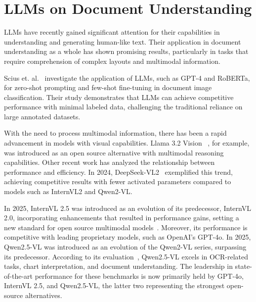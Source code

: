 \section{LLMs on Document Understanding}

\glspl{LLM} have recently gained significant attention for their capabilities in understanding and generating human-like text. Their application in document understanding as a whole has shown promising results, particularly in tasks that require comprehension of complex layouts and multimodal information.

Scius et. al.~\cite{scius2024zeroshot} investigate the application of \glspl{LLM}, such as GPT-4 and RoBERTa, for zero-shot prompting and few-shot fine-tuning in document image classification. Their study demonstrates that \glspl{LLM} can achieve competitive performance with minimal labeled data, challenging the traditional reliance on large annotated datasets.

With the need to process multimodal information, there has been a rapid advancement in models with visual capabilities. Llama 3.2 Vision ~\cite{meta2024llama3.2}, for example, was introduced as an open source alternative with multimodal reasoning capabilities. Other recent work has analyzed the relationship between performance and efficiency. In 2024, DeepSeek-VL2~\cite{DBLP:journals/corr/abs-2412-10302} exemplified this trend, achieving competitive results with fewer activated parameters compared to models such as InternVL2 and Qwen2-VL.

In 2025, InternVL 2.5 was introduced as an evolution of its predecessor, InternVL 2.0, incorporating enhancements that resulted in performance gains, setting a new standard for open source multimodal models~\cite{internvl2024}. Moreover, its performance is competitive with leading proprietary models, such as OpenAI’s GPT-4o\cite{openai2024gpt4o,openai2024gpt4omini}.
In 2025, Qwen2.5-VL was introduced as an evolution of the Qwen2-VL series, surpassing its predecessor. According to its evaluation~\cite{bai2025qwen2}, Qwen2.5-VL excels in OCR-related tasks, chart interpretation, and document understanding. The leadership in state-of-the-art performance for these benchmarks is now primarily held by GPT-4o, InternVL 2.5, and Qwen2.5-VL, the latter two representing the strongest open-source alternatives.
